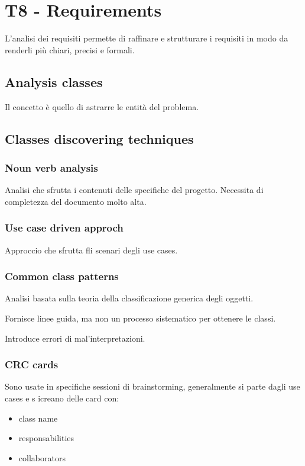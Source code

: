 \documentclass{article}
\begin{document}
\section{T8 - Requirements}
L'analisi dei requisiti permette di raffinare e strutturare i requisiti in 
modo da renderli più chiari, precisi e formali.


\subsection{Analysis classes}
Il concetto è quello di astrarre le entità del problema.

\subsection{Classes discovering techniques}
\subsubsection{Noun verb analysis}
Analisi che sfrutta i contenuti delle specifiche del progetto.
Necessita di completezza del documento molto alta.

\subsubsection{Use case driven approch}
Approccio che sfrutta fli scenari degli use cases.
\subsubsection{Common class patterns}
Analisi basata sulla teoria della classificazione generica degli oggetti.

Fornisce linee guida, ma non un processo sistematico per ottenere le classi.


Introduce errori di mal'interpretazioni.

\subsubsection{CRC cards}
Sono usate in specifiche sessioni di brainstorming, generalmente si 
parte dagli use cases e s icreano delle card con:
\begin{itemize}
    \item class name
    \item responsabilities
    \item collaborators
\end{itemize}
\end{document}
